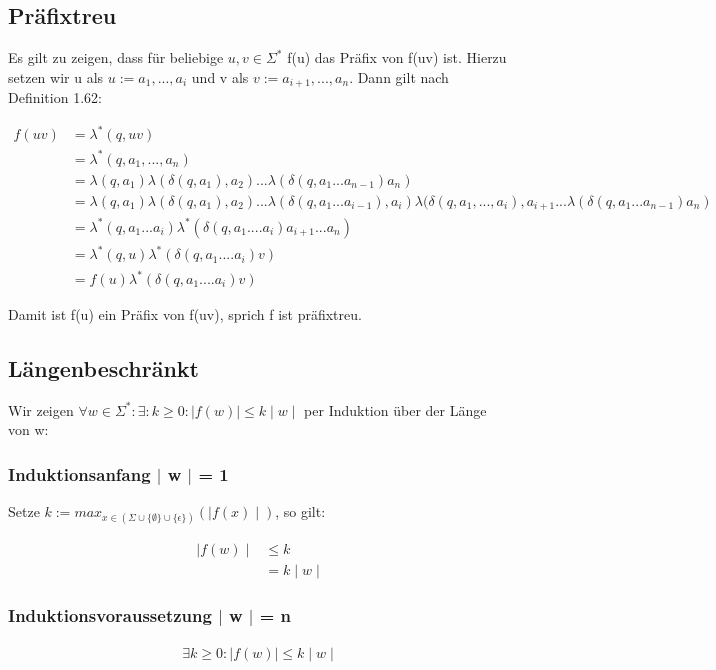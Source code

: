 \documentclass[12pt, a4paper]{article}
\begin{document}
\subsection*{Präfixtreu}
Es gilt zu zeigen, dass für beliebige $u,v \in \Sigma^*$ f(u) das Präfix von f(uv) ist. Hierzu setzen wir u als $u := a_1,...,a_i$ und v als $v := a_{i+1},...,a_n$. Dann gilt nach Definition 1.62:

\begin{align*}
f(uv) &= \lambda^*(q,uv) \\
&= \lambda^*(q, a_1,...,a_n) \\
&= \lambda(q,a_1) \lambda(\delta(q, a_1), a_2) ... \lambda(\delta(q,a_1...a_{n-1})a_n) \\
&= \lambda(q,a_1) \lambda(\delta(q, a_1), a_2) ... \lambda(\delta(q, a_1 ... a_{i-1}), a_i) \lambda(\delta(q, a_1,..., a_i), a_{i+1} ...  \lambda(\delta(q,a_1...a_{n-1})a_n) \\
&= \lambda^*(q,a_1 ... a_i) \lambda^*(\delta(q, a_1 .... a_i) a_{i+1} ... a_n) \\
&= \lambda^*(q,u) \lambda^*(\delta(q, a_1 .... a_i) v)\\
&= f(u) \lambda^*(\delta(q, a_1 .... a_i) v)
\end{align*}

Damit ist f(u) ein Präfix von f(uv), sprich f ist präfixtreu.

\subsection*{Längenbeschränkt}
Wir zeigen $\forall w \in \Sigma^*: \exists: k \ge 0: \mid f(w) \mid \le k \mid w \mid $ per Induktion über der Länge von w:

\subsubsection*{Induktionsanfang $\mid$ w $\mid$ = 1}
Setze $k := max_{x \in (\Sigma \cup \{ \emptyset \} \cup \{ \epsilon \})}( \mid f(x) \mid)$, so gilt:

\begin{align*}
\mid f(w) \mid &\le k \\
&= k \mid w \mid
\end{align*}

\subsubsection*{Induktionsvoraussetzung $\mid$ w $\mid$ = n}
\begin{align*}
\exists k \ge 0: \mid f(w) \mid \le k \mid w \mid
\end{align*}
\end{document}
